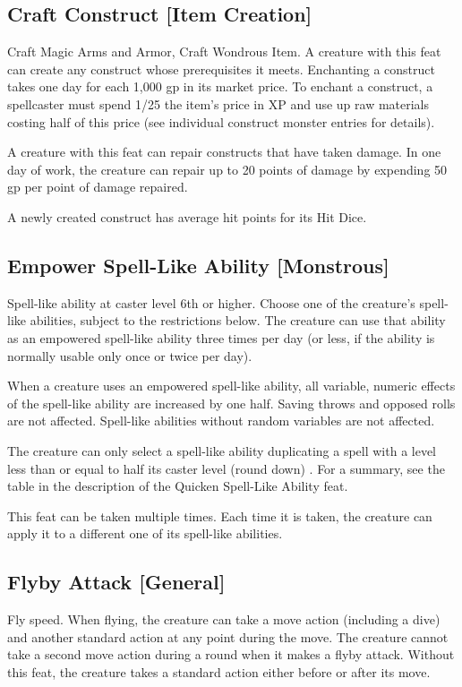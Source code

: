 {\subsection{Craft Construct [Item Creation]}
 Craft Magic Arms and Armor, Craft Wondrous Item.
 A creature with this feat can create any construct whose prerequisites it meets. Enchanting a construct takes one day for each 1,000 gp in its market price. To enchant a construct, a spellcaster must spend 1/25 the item's price in XP and use up raw materials costing half of this price (see individual construct monster entries for details).

A creature with this feat can repair constructs that have taken damage. In one day of work, the creature can repair up to 20 points of damage by expending 50 gp per point of damage repaired.

A newly created construct has average hit points for its Hit Dice.

\subsection{Empower Spell-Like Ability [Monstrous]}
 Spell-like ability at caster level 6th or higher.
 Choose one of the creature's spell-like abilities, subject to the restrictions below. The creature can use that ability as an empowered spell-like ability three times per day (or less, if the ability is normally usable only once or twice per day).

When a creature uses an empowered spell-like ability, all variable, numeric effects of the spell-like ability are increased by one half. Saving throws and opposed rolls are not affected. Spell-like abilities without random variables are not affected.

The creature can only select a spell-like ability duplicating a spell with a level less than or equal to half its caster level (round down) . For a summary, see the table in the description of the Quicken Spell-Like Ability feat. 

 This feat can be taken multiple times. Each time it is taken, the creature can apply it to a different one of its spell-like abilities.

\subsection{Flyby Attack [General]}
 Fly speed.
 When flying, the creature can take a move action (including a dive) and another standard action at any point during the move. The creature cannot take a second move action during a round when it makes a flyby attack.
 Without this feat, the creature takes a standard action either before or after its move.

}
